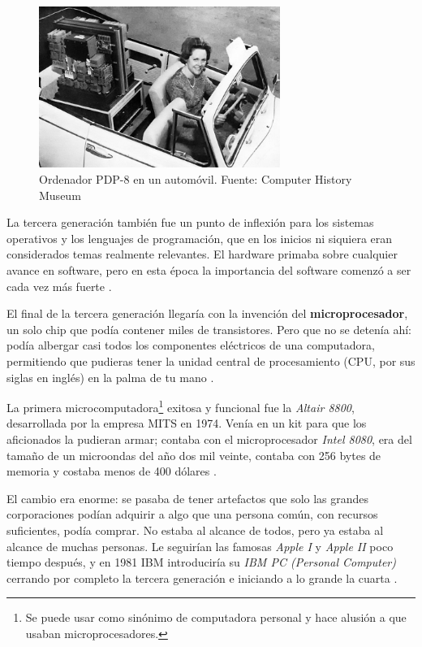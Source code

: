 \documentclass[letterpaper,12pt,oneside]{book}
\begin{document}
		\begin{figure}
		    \centering
		    \includegraphics[width=0.7\textwidth]{media/Historia/CHM_computers_1964.pdp8.jpg}
		    \caption{Ordenador PDP-8 en un automóvil. Fuente: Computer History Museum} %
	    	\label{fig:pdp8}
		\end{figure}
		
		La tercera generación también fue un punto de inflexión para los sistemas operativos y los lenguajes de programación, que en los inicios
		ni siquiera eran considerados temas realmente relevantes. El hardware primaba sobre cualquier avance en software, pero en esta época
		la importancia del software comenzó a ser cada vez más fuerte \cite{tanenbaum_modern_2002}.
		
		El final de la tercera generación llegaría con la invención del \textbf{microprocesador}, un solo chip que podía contener miles de transistores.
		Pero que no se detenía ahí: podía albergar casi todos los componentes eléctricos de una computadora, permitiendo que pudieras tener la unidad central de procesamiento (CPU, por sus
		siglas en inglés) en la palma de tu mano \cite{null_essentials_2003}.
  
        La primera microcomputadora\footnote{Se puede usar como sinónimo de computadora personal y hace alusión a que usaban microprocesadores.} exitosa y funcional
		fue la \textit{Altair 8800}, desarrollada por la empresa MITS en 1974. Venía en un kit para que los aficionados la pudieran armar; contaba
		con el microprocesador \textit{Intel 8080}, era del tamaño de un microondas del año dos mil veinte, contaba con 256 bytes de memoria y costaba menos de 400 dólares \cite{null_essentials_2003}.
  
        
        El cambio
		era enorme: se pasaba de tener artefactos que solo las grandes corporaciones podían adquirir a algo que una persona común, con recursos suficientes,
		podía comprar. No estaba al alcance de todos, pero ya estaba al alcance de muchas personas. Le seguirían las famosas \textit{Apple I}
		y \textit{Apple II} poco tiempo después, y en 1981 IBM introduciría su \textit{IBM PC (Personal Computer)} cerrando por completo la tercera generación e iniciando a lo grande la cuarta \cite{null_essentials_2003}.
\end{document}
